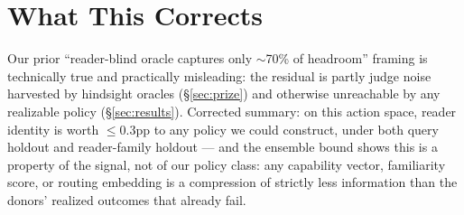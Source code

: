 \section{What This Corrects}
\label{sec:correction}

Our prior ``reader-blind oracle captures only $\sim$70\% of headroom'' framing
\citep{panthi2026fixed} is technically true and practically misleading: the
residual is partly judge noise harvested by hindsight oracles
(\S\ref{sec:prize}) and otherwise unreachable by any realizable policy
(\S\ref{sec:results}). Corrected summary: on this action space, reader identity
is worth $\le0.3$pp to any policy we could construct, under both query holdout
and reader-family holdout --- and the ensemble bound shows this is a property of
the signal, not of our policy class: any capability vector, familiarity score,
or routing embedding is a compression of strictly less information than the
donors' realized outcomes that already fail.
